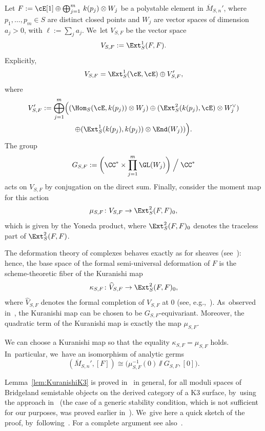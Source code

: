 Let $F:=\cE[1]\oplus \bigoplus_{j=1}^m\, k(p_j)\otimes W_j$ be a polystable element in $\overline{M}{}_{S,n}'$, where $p_1,\dots,p_m\in S$ are distinct closed points and $W_j$ are vector spaces of dimension $a_j>0$, with $\ell:=\sum_j a_j$. We~let $V_{S,F}$ be the vector space
\[
V_{S,F}:=\Ext^1_S(F,F).
\]
Explicitly,
\begin{equation*}\label{eq:SplittingK3Antony}
V_{S,F}=\Ext^1_S(\cE,\cE)\oplus V_{S,F}',
\end{equation*}
where
\begin{multline}\label{eqroma24}
V_{S,F}':=\bigoplus_{j=1}^m\Bigl((\Hom_S(\cE,k(p_j))\otimes W_j) \oplus (\Ext^2_S(k(p_j),\cE)\otimes W_j^\vee)\\
\oplus (\Ext^1_S(k(p_j),k(p_j))\otimes \End(W_j)) \Bigr).
\end{multline}
The group
\begin{equation}\label{eq:group}
G_{S,F}:=\biggl(\CC^*\times \prod_{j=1}^m\GL(W_j)\biggr)\Bigm/\CC^*
\end{equation}
acts on $V_{S,F}$ by conjugation on the direct sum.
Finally, consider the moment map for this action
\[
\mu_{S,F}\colon V_{S,F} \to \Ext^2_S(F,F)_0,
\]
which is given by the Yoneda product, where $\Ext^2_S(F,F)_0$ denotes the traceless part of $\Ext^2_S(F,F)$.

The deformation theory of complexes behaves exactly as for sheaves (see~\cite[Th.\,3.1.1]{Lieblich:moduli}): hence, the base space of the formal semi-universal deformation of $F$ is the scheme-theoretic fiber of the Kuranishi map
\[
\kappa_{S,F} \colon \widehat{V}_{S,F} \to \Ext^2_S(F,F)_0,
\]
where $\widehat{V}_{S,F}$ denotes the formal completion of $V_{S,F}$ at $0$ (see, e.g.,~\cite[\S 3]{AS:singularities}). As~observed in~\cite[\S 4]{AS:singularities}, the Kuranishi map can be chosen to be $G_{S,F}$-equivariant.
Moreover, the quadratic term of the Kuranishi map is exactly the map $\mu_{S,F}$.

\begin{lemm}\label{lem:KuranishiK3}
We can choose a Kuranishi map so that the equality $\kappa_{S,F}=\mu_{S,F}$ holds. In~particular, we~have an isomorphism of analytic germs
\[
\left(\overline{M}{}_{S,n}',[F]\right)\cong \bigl(\mu_{S,F}^{-1}(0)\sslash G_{S,F},[0]\bigr).
\]
\end{lemm}

Lemma~\ref{lem:KuranishiK3} is proved in~\cite[\S 3.2]{PZ:FormalityBridgeland} in general, for all moduli spaces of Bridgeland semistable objects on the derived category of a K3 surface, by~using the approach in~\cite{BMM:Formality} (the case of a generic stability condition, which is not sufficient for our purposes, was proved earlier in~\cite{BZ:Kuranishi}). We~give here a quick sketch of the proof, by~following~\cite{PZ:FormalityBridgeland}. For a complete argument see also~\cite[Th.\,3.2]{AS:Formality}.

